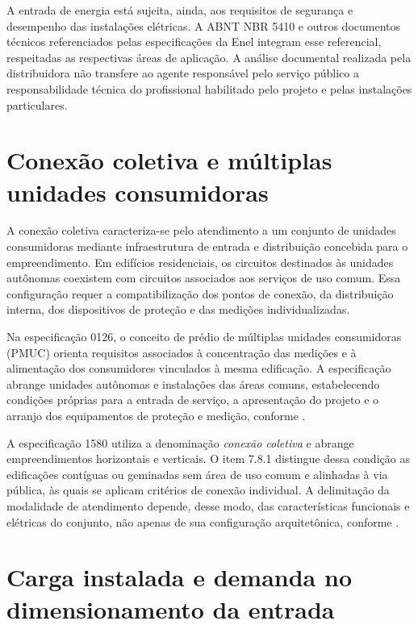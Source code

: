 A entrada de energia está sujeita, ainda, aos requisitos de segurança e desempenho das instalações elétricas. A ABNT NBR 5410 e outros documentos técnicos referenciados pelas especificações da Enel integram esse referencial, respeitadas as respectivas áreas de aplicação. A análise documental realizada pela distribuidora não transfere ao agente responsável pelo serviço público a responsabilidade técnica do profissional habilitado pelo projeto e pelas instalações particulares.

\section{Conexão coletiva e múltiplas unidades consumidoras}
\label{sec:conexaocoletiva}

A conexão coletiva caracteriza-se pelo atendimento a um conjunto de unidades consumidoras mediante infraestrutura de entrada e distribuição concebida para o empreendimento. Em edifícios residenciais, os circuitos destinados às unidades autônomas coexistem com circuitos associados aos serviços de uso comum. Essa configuração requer a compatibilização dos pontos de conexão, da distribuição interna, dos dispositivos de proteção e das medições individualizadas.

Na especificação 0126, o conceito de prédio de múltiplas unidades consumidoras (PMUC) orienta requisitos associados à concentração das medições e à alimentação dos consumidores vinculados à mesma edificação. A especificação abrange unidades autônomas e instalações das áreas comuns, estabelecendo condições próprias para a entrada de serviço, a apresentação do projeto e o arranjo dos equipamentos de proteção e medição, conforme .

A especificação 1580 utiliza a denominação \emph{conexão coletiva} e abrange empreendimentos horizontais e verticais. O item 7.8.1 distingue dessa condição as edificações contíguas ou geminadas sem área de uso comum e alinhadas à via pública, às quais se aplicam critérios de conexão individual. A delimitação da modalidade de atendimento depende, desse modo, das características funcionais e elétricas do conjunto, não apenas de sua configuração arquitetônica, conforme .

\section{Carga instalada e demanda no dimensionamento da entrada}
\label{sec:demandas}

